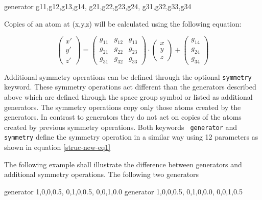 \begin{MacVerbatim}
    generator g11,g12,g13,g14, g21,g22,g23,g24, g31,g32,g33,g34
\end{MacVerbatim}

Copies of an atom at (x,y,z) will be calculated using the following
equation:

\begin{equation}
        \left ( \begin{array}{c} x'\\ y'\\ z'\end{array} \right ) =
        \left (
        \begin{array}{ccc}
                g_{11} & g_{12} & g_{13}  \\
                g_{21} & g_{22} & g_{23}  \\
                g_{31} & g_{32} & g_{33}
        \end{array}
        \right ) \cdot
        \left ( \begin{array}{c} x\\ y\\ z\end{array} \right ) +
        \left ( \begin{array}{c} g_{14}\\ g_{24}\\ g_{34}\end{array} \right )
        \label{struc-new-eq1}
\end{equation}

Additional symmetry operations can be defined through the optional
{\tt symmetry} keyword.  These symmetry operations act different
than the generators described above which are defined through the
space group symbol or listed as additional generators.  The symmetry
operations copy only those atoms created by the generators.  In
contrast to generators they do not act on copies of the atoms
created by previous symmetry operations. Both keywords {\tt
generator} and {\tt symmetry} define the symmetry operation in a
similar way using 12 parameters as shown in equation
\ref{struc-new-eq1}
\par

The following example shall illustrate the difference between
generators and additional symmetry operations.  The following two
generators

\begin{MacVerbatim}
    generator 1,0,0,0.5, 0,1,0,0.5, 0,0,1,0.0
    generator 1,0,0,0.5, 0,1,0,0.0, 0,0,1,0.5
\end{MacVerbatim}

